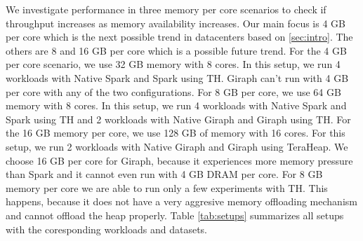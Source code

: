 We investigate performance in three memory per core scenarios to check if throughput increases as memory availability increases. Our main focus is 4 GB per core which is the next possible trend in datacenters based on \ref{sec:intro}. The others
are 8 and 16 GB per core which is a possible future trend. For the 4 GB per core scenario, we use 32 GB memory with 8 cores.
In this setup, we run 4 workloads with Native Spark and Spark using TH. Giraph can't run with 4 GB per core with any of the two
configurations. For 8 GB per core, we use 64 GB memory with 8 cores. 
In this setup, we run 4 workloads with Native Spark and Spark using TH and 2 workloads with Native Giraph and Giraph using TH. For the 16 GB memory per core, we use 128 GB of memory with 16 cores. For this setup, we run 2 workloads with Native Giraph and Giraph using TeraHeap. We choose 16 GB per core for Giraph, because it experiences more memory pressure than Spark and it cannot even run with 4 GB DRAM per core. For 8 GB memory per core we are able to run only a few experiments with TH. This happens, because it does not have a very aggresive memory offloading mechanism and cannot offload the heap properly. Table \ref{tab:setups} summarizes all setups with the coresponding workloads and datasets.


